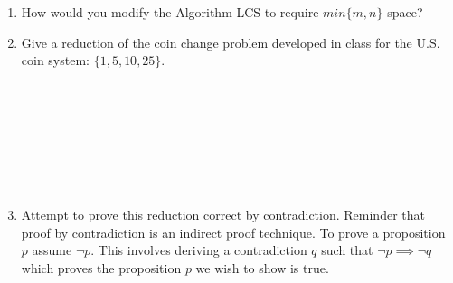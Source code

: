 \documentclass[12pt]{article}
\begin{document}
\begin{enumerate}
 \item How would you modify the Algorithm LCS to require $min\{m,n\}$ space?
\newpage
\item Give a reduction of the coin change problem developed in class for the U.S. coin system: $\{1,5,10,25\}$.\\\\\\\\\\\\\\\\
\item Attempt to prove this reduction correct by contradiction. Reminder that proof by contradiction is an indirect proof technique. To 
prove a proposition $p$ assume $\neg p$. This involves deriving a contradiction $q$ such that $\neg p \implies \neg q$ which proves the proposition $p$
we wish to show is true.
\end{enumerate}
\end{document}
